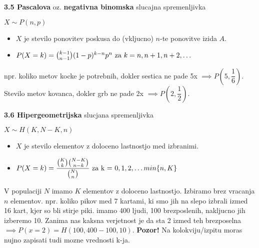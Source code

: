 \documentclass{article}
\begin{document}
\begin{multicols}{2}
\textbf{3.5 Pascalova} oz. \textbf{negativna binomska} slucajna spremenljivka
\begin{center}
    \begin{math}
        X \sim P(n, p)
    \end{math}
\end{center}
\begin{itemize}
    \item $X$ je stevilo ponovitev poskusa do (vkljucno) $n$-te ponovitve izida $A$.
    \item \begin{math}
        P(X = k) = {k - 1 \choose n - 1 }(1 - p)^{k - n} p^{n} $ za $ k = n, n + 1, n + 2, \dots
    \end{math}
\end{itemize}
npr. koliko metov kocke je potrebnih, dokler sestica ne pade 5x $\implies P(5, \dfrac{1}{6})$. Stevilo metov kovanca,
dokler grb ne pade 2x $\implies P(2, \dfrac{1}{2})$.

\textbf{3.6 Hipergeometrijska} slucjana spremenljivka
\begin{center}
    \begin{math}
        X \sim H(K, N - K, n)
    \end{math}
\end{center}
\begin{itemize}
    \item $X$ je stevilo elementov z doloceno lastnostjo med izbranimi.
    \item \begin{math}
        P(X = k) =  \dfrac{ {K \choose k} {N - K \choose n - k} }{{N \choose n}} $ za k = $ 0,1,2,\dots min\{ n, K \}
    \end{math}
\end{itemize}
V populaciji $N$  imamo $K$ elementov  z doloceno lastnostjo. Izbiramo brez vracanja $n$ elementov.
npr. koliko pikov med 7 kartami, ki smo jih na slepo izbrali izmed 16 kart, kjer so bli stirje piki.
imamo 400 ljudi, 100 brezposlenih, nakljucno jih izberemo 10. Zanima nas kaksna verjetnost je da sta 
2 izmed teh brezposelna $\implies P(x=2) = H(100, 400-100, 10)$.
\textbf{Pozor!} Na kolokviju/izpitu moras nujno zapisati tudi mozne vrednosti k-ja.


\end{multicols}
\end{document}
